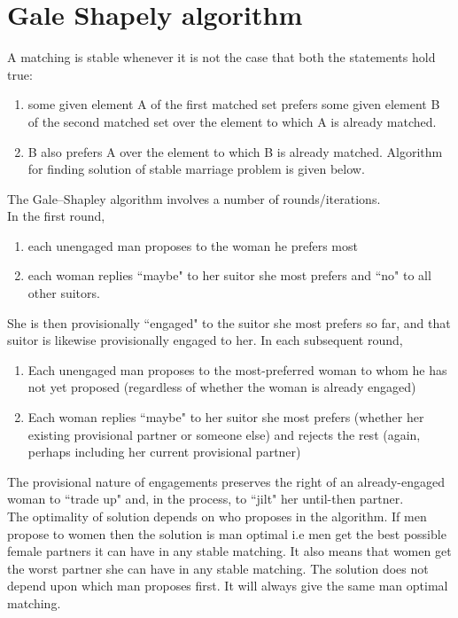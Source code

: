 \documentclass[a4paper]{report}
\theoremstyle{definition}
\begin{document}
\chapter{Gale Shapely algorithm}
A matching is stable whenever it is not the case that both the statements hold true:
\begin{enumerate}
\item some given element A of the first matched set prefers some given element B of the second matched set over the element to which A is already matched.
\item B also prefers A over the element to which B is already matched.
Algorithm for finding solution of stable marriage problem is given below.
\end{enumerate}
The Gale–Shapley algorithm involves a number of rounds/iterations.\\
 In the first round, \\
\begin{enumerate}
\item each unengaged man proposes to the woman he prefers most
\item  each woman replies ``maybe" to her suitor she most prefers and ``no" to all other suitors.
\end{enumerate}
 She is then provisionally ``engaged" to the suitor she most prefers so far, and that suitor is likewise provisionally engaged to her. In each subsequent round,
\begin{enumerate}
\item Each unengaged man proposes to the most-preferred woman to whom he has not yet proposed (regardless of whether the woman is already engaged)
\item Each woman replies ``maybe" to her suitor she most prefers (whether her existing provisional partner or someone else) and rejects the rest (again, perhaps including her current provisional partner)
\end{enumerate}
The provisional nature of engagements preserves the right of an already-engaged woman to ``trade up" and, in the process, to ``jilt" her until-then partner.\\
The optimality of solution depends on who proposes in the algorithm. If men propose to women then the solution is man optimal i.e men get the best possible female partners it can have in any stable matching. It also means that women get the worst partner she can have in any stable matching. The solution does not depend upon which man proposes first. It will always give the same man optimal matching.
\end{document}
